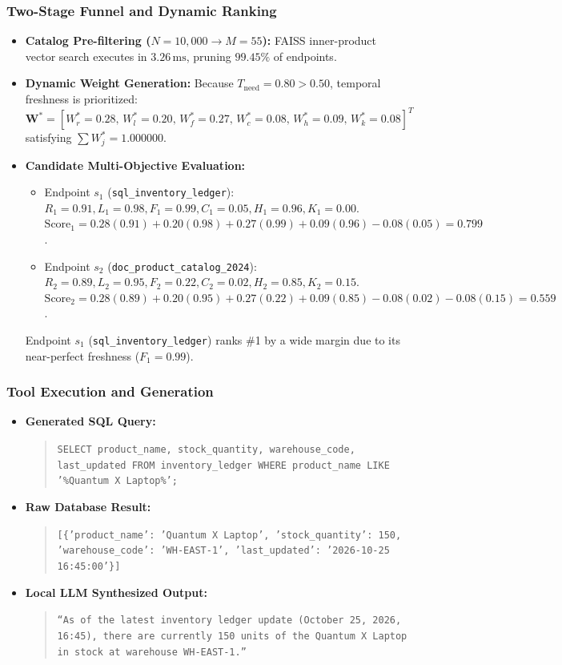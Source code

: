 \subsubsection{Two-Stage Funnel and Dynamic Ranking}
\begin{itemize}
    \item \textbf{Catalog Pre-filtering ($N=10,000 \to M=55$):} FAISS inner-product vector search executes in $3.26\,\text{ms}$, pruning $99.45\%$ of endpoints.
    \item \textbf{Dynamic Weight Generation:} Because $T_{\text{need}} = 0.80 > 0.50$, temporal freshness is prioritized:
    \begin{equation}
        \mathbf{W}^* = [W_r^* = 0.28, \, W_l^* = 0.20, \, W_f^* = 0.27, \, W_c^* = 0.08, \, W_h^* = 0.09, \, W_k^* = 0.08]^T
    \end{equation}
    satisfying $\sum W_j^* = 1.000000$.
    \item \textbf{Candidate Multi-Objective Evaluation:}
    \begin{itemize}
        \item Endpoint $s_1$ (\texttt{sql\_inventory\_ledger}): $R_1 = 0.91, L_1 = 0.98, F_1 = 0.99, C_1 = 0.05, H_1 = 0.96, K_1 = 0.00$.  
        $\text{Score}_1 = 0.28(0.91) + 0.20(0.98) + 0.27(0.99) + 0.09(0.96) - 0.08(0.05) = \mathbf{0.799}$.
        \item Endpoint $s_2$ (\texttt{doc\_product\_catalog\_2024}): $R_2 = 0.89, L_2 = 0.95, F_2 = 0.22, C_2 = 0.02, H_2 = 0.85, K_2 = 0.15$.  
        $\text{Score}_2 = 0.28(0.89) + 0.20(0.95) + 0.27(0.22) + 0.09(0.85) - 0.08(0.02) - 0.08(0.15) = \mathbf{0.559}$.
    \end{itemize}
    Endpoint $s_1$ (\texttt{sql\_inventory\_ledger}) ranks \#1 by a wide margin due to its near-perfect freshness ($F_1 = 0.99$).
\end{itemize}

\subsubsection{Tool Execution and Generation}
\begin{itemize}
    \item \textbf{Generated SQL Query:}
    \begin{quote}
        \texttt{SELECT product\_name, stock\_quantity, warehouse\_code, last\_updated FROM inventory\_ledger WHERE product\_name LIKE '\%Quantum X Laptop\%';}
    \end{quote}
    \item \textbf{Raw Database Result:}
    \begin{quote}
        \texttt{[\{'product\_name': 'Quantum X Laptop', 'stock\_quantity': 150, 'warehouse\_code': 'WH-EAST-1', 'last\_updated': '2026-10-25 16:45:00'\}]}
    \end{quote}
    \item \textbf{Local LLM Synthesized Output:}
    \begin{quote}
        \texttt{``As of the latest inventory ledger update (October 25, 2026, 16:45), there are currently 150 units of the Quantum X Laptop in stock at warehouse WH-EAST-1.''}
    \end{quote}
\end{itemize}

